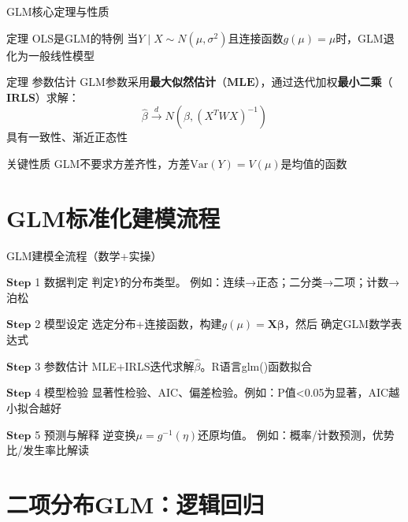 \documentclass[aspectratio=169]{beamer}
\begin{document}
\begin{frame}{GLM核心定理与性质}
\begin{block}{定理 OLS是GLM的特例}
当$Y\mid X\sim N(\mu,\sigma^2)$且连接函数$g(\mu)=\mu$时，GLM退化为一般线性模型
\end{block}
\begin{block}{定理 参数估计}
GLM参数采用\textbf{最大似然估计}（$\boldsymbol{MLE}$），通过迭代加权\textbf{最小二乘}（$\boldsymbol{IRLS}$）求解：
\[ \hat{\beta} \xrightarrow{d} N(\beta,(X^TWX)^{-1}) \]
具有一致性、渐近正态性
\end{block}
\begin{block}{关键性质}
GLM不要求方差齐性，方差$\text{Var}(Y)=V(\mu)$是均值的函数
\end{block}
\end{frame}


\section{GLM标准化建模流程}

\begin{frame}{GLM建模全流程（数学+实操）}
\begin{block}{$\mathbf{Step}$ 1 数据判定}
判定$Y$的分布类型。\,\,例如：连续→正态；二分类→二项；计数→泊松
\end{block}
\begin{block}{$\mathbf{Step}$ 2 模型设定}
选定分布+连接函数，构建$g(\mu)=\boldsymbol{X\beta}$，然后
确定GLM数学表达式
\end{block}
\begin{block}{$\mathbf{Step}$ 3 参数估计}
MLE+IRLS迭代求解$\hat{\beta}$。R语言glm()函数拟合
\end{block}
\begin{block}{$\mathbf{Step}$ 4 模型检验}
显著性检验、AIC、偏差检验。例如：P值<0.05为显著，AIC越小拟合越好
\end{block}
\begin{block}{$\mathbf{Step}$ 5 预测与解释}
逆变换$\mu=g^{-1}(\eta)$还原均值。\,\,例如：概率/计数预测，优势比/发生率比解读
\end{block}
\end{frame}


\section{二项分布GLM：逻辑回归}
\end{document}
